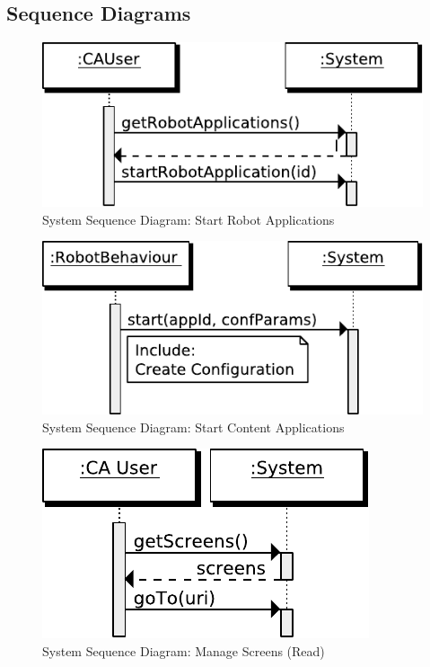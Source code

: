 \subsection{Sequence Diagrams}
\begin{figure}[htb]
    \centering
    \includegraphics{figures/spec-seq-start-qtapp.pdf}
    \caption{System Sequence Diagram: Start Robot Applications}
    \label{fig:spec-start-qtapp}
\end{figure}

\begin{figure}[htb]
    \centering
    \includegraphics{figures/spec-seq-start-contents-app.pdf}
    \caption{System Sequence Diagram: Start Content Applications}
    \label{fig:spec-start-ca}
\end{figure}

\begin{figure}[htb]
    \centering
    \includegraphics{figures/spec-seq-manage-screens-read.pdf}
    \caption{System Sequence Diagram: Manage Screens (Read)}
    \label{fig:spec-manage-screens-read}
\end{figure}

